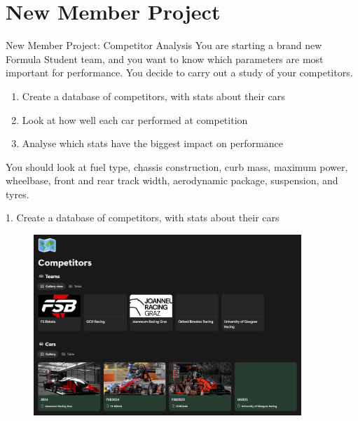 \section*{New Member Project}
\begin{frame}{New Member Project: Competitor Analysis}
    You are starting a brand new Formula Student team,
    and you want to know which parameters are most important for performance.
    You decide to carry out a study of your competitors.
    \vspace*{2ex}
    \begin{enumerate}
        \item Create a database of competitors, with stats about their cars
        \item Look at how well each car performed at competition
        \item Analyse which stats have the biggest impact on performance
    \end{enumerate}
    \vspace*{2ex}
    You should look at fuel type, chassis construction, curb mass,
    maximum power, wheelbase, front and rear track width,
    aerodynamic package, suspension, and tyres.
\end{frame}

\begin{frame}
    \begin{center}
        1. Create a database of competitors, with stats about their cars
        \begin{figure}
            \includegraphics[width=0.9\textwidth]{res/Notion Competitor Database.png}
        \end{figure}
    \end{center}
\end{frame}

